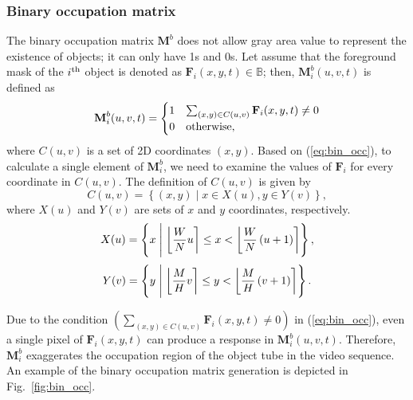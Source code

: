 \documentclass[11pt]{hyu_thesis}
\begin{document}
\subsubsection{Binary occupation matrix}
\label{sec:proposed:occ:binary}
The binary occupation matrix $\textbf{M}^b$ does not allow gray area value to represent the existence of objects; it can only have 1s and 0s. Let assume that the foreground mask of the $i^{\rm{th}}$ object is denoted as $\textbf{F}_i(x,y,t) \in \mathbb{B}$; then, $\textbf{M}_i^b(u,v,t)$ is defined as
\begin{equation}
\label{eq:bin_occ}
\textbf{M}_i^b(u,v,t)=
\begin{cases}
1 & \sum_{(x,y) \in C(u,v)}\textbf{F}_i(x,y,t) \neq 0 \\
0 & \rm{otherwise},
\end{cases}
\end{equation}
where $C(u,v)$ is a set of 2D coordinates $(x,y)$. Based on (\ref{eq:bin_occ}), to calculate a single element of $\textbf{M}_i^b$, we need to examine the values of $\textbf{F}_i$ for every coordinate in $C(u,v)$. The definition of $C(u,v)$ is given by
\begin{equation}
C(u,v)=\left\{ (x,y) \mid x \in X(u), y \in Y(v) \right\},
\end{equation}
where $X(u)$ and $Y(v)$ are sets of $x$ and $y$ coordinates, respectively.
\begin{equation}
X(u)=\left\{ x \;\middle|\; \round*{\frac{W}{N}u} \leq x < \round*{\frac{W}{N}\left( u + 1 \right)} \right\},
\end{equation}
\begin{equation}
Y(v)=\left\{ y \;\middle|\; \round*{\frac{M}{H}v} \leq y < \round*{\frac{M}{H}\left( v + 1 \right)} \right\}.
\end{equation}

Due to the condition $\left( \sum_{(x,y) \in C(u,v)}\textbf{F}_i(x,y,t) \neq 0 \right)$ in (\ref{eq:bin_occ}), even a single pixel of $\textbf{F}_i(x,y,t)$ can produce a response in $\textbf{M}_i^b(u,v,t)$. Therefore, $\textbf{M}_i^b$ exaggerates the occupation region of the object tube in the video sequence. An example of the binary occupation matrix generation is depicted in Fig.~\ref{fig:bin_occ}.
\end{document}
